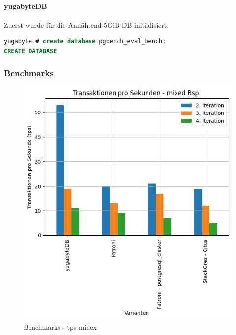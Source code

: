 
\begin{flushleft}
    \paragraph{yugabyteDB}
    Zuerst wurde für die Annährend 5GiB-DB initialisiert:
\lstset{style=gra_codestyle}
\begin{lstlisting}[language=sql, caption=yugabyteDB - Benchmarking - DB erstellen,captionpos=b,label={lst:yugabytedb-benchmarking-create-db},breaklines=true]
yugabyte=# create database pgbench_eval_bench;
CREATE DATABASE
\end{lstlisting}


    \subsubsection{Benchmarks}
    \begin{figure}[H]
        \centering
        \includegraphics[width=1\linewidth]{source/pandas_data_chart_plotter/tps_mixed}
        \caption{Benchmarks - tps midex}
        \label{fig:tps_mixed}
    \end{figure}
\end{flushleft}
